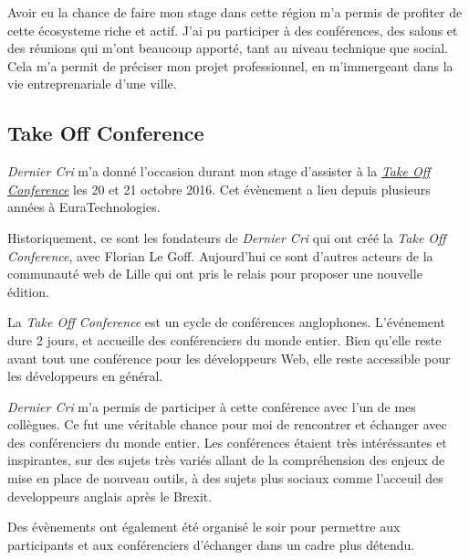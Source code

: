 \documentclass[12pt,a4paper]{article}
\begin{document}
  Avoir eu la chance de faire mon stage dans cette région m'a permis de
  profiter de cette écosysteme riche et actif. J'ai pu participer à des
  conférences, des salons et des réunions qui m'ont beaucoup apporté, tant
  au niveau technique que social. Cela m'a permit de préciser mon projet
  professionnel, en m'immergeant dans la vie entreprenariale d'une ville.

  \bigskip

  \subsection{Take Off Conference}\label{take-off-conference}

  \bigskip

  \emph{Dernier Cri} m'a donné l'occasion durant mon stage d'assister à la
  \href{http://takeoffconf.com/2016}{\emph{Take Off Conference}} les 20 et
  21 octobre 2016. Cet évènement a lieu depuis plusieurs années à
  EuraTechnologies.

  \bigskip

  Historiquement, ce sont les fondateurs de \emph{Dernier Cri} qui ont
  créé la \emph{Take Off Conference}, avec Florian Le Goff. Aujourd'hui ce
  sont d'autres acteurs de la communauté web de Lille qui ont pris le
  relais pour proposer une nouvelle édition.

  \bigskip

  La \emph{Take Off Conference} est un cycle de conférences anglophones.
  L'événement dure 2 jours, et accueille des conférenciers du monde
  entier. Bien qu'elle reste avant tout une conférence pour les
  développeurs Web, elle reste accessible pour les développeurs en
  général.

  \bigskip

  \emph{Dernier Cri} m'a permis de participer à cette conférence avec l'un
  de mes collègues. Ce fut une véritable chance pour moi de rencontrer et
  échanger avec des conférenciers du monde entier. Les conférences étaient
  très intéréssantes et inspirantes, sur des sujets très variés allant de
  la compréhension des enjeux de mise en place de nouveau outils, à des
  sujets plus sociaux comme l'acceuil des developpeurs anglais après le
  Brexit.

  \bigskip

  Des évènements ont également été organisé le soir pour permettre aux
  participants et aux conférenciers d'échanger dans un cadre plus détendu.

  \bigskip
\end{document}
